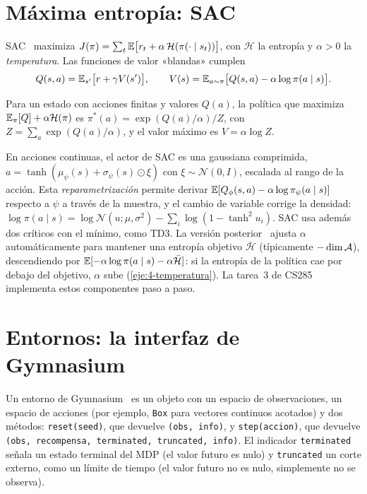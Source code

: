 \section{Máxima entropía: SAC}

\begin{definicion}\label{def:maxent}
SAC~\cite{sac} maximiza $J(\pi)=\sum_t\mathbb{E}\bigl[r_t+\alpha\,\mathcal H(\pi(\cdot\mid s_t))\bigr]$, con $\mathcal H$ la entropía y $\alpha>0$ la \emph{temperatura}. Las funciones de valor «blandas» cumplen
\[
Q(s,a)=\mathbb{E}_{s'}\bigl[r+\gamma V(s')\bigr],\qquad V(s)=\mathbb{E}_{a\sim\pi}\bigl[Q(s,a)-\alpha\log\pi(a\mid s)\bigr].
\]
\end{definicion}

\begin{proposicion}\label{prop:blanda}
Para un estado con acciones finitas y valores $Q(a)$, la política que maximiza $\mathbb{E}_\pi[Q]+\alpha\mathcal H(\pi)$ es $\pi^{*}(a)=\exp(Q(a)/\alpha)/Z$, con $Z=\sum_a\exp(Q(a)/\alpha)$, y el valor máximo es $V=\alpha\log Z$.
\end{proposicion}

\addtocounter{definicion}{1}%

En acciones continuas, el actor de SAC es una gaussiana comprimida, $a=\tanh(\mu_\psi(s)+\sigma_\psi(s)\odot\xi)$ con $\xi\sim\mathcal N(0,I)$, escalada al rango de la acción. Esta \emph{reparametrización} permite derivar $\mathbb{E}[Q_\phi(s,a)-\alpha\log\pi_\psi(a\mid s)]$ respecto a $\psi$ a través de la muestra, y el cambio de variable corrige la densidad: $\log\pi(a\mid s)=\log\mathcal N(u;\mu,\sigma^{2})-\sum_i\log(1-\tanh^{2}u_i)$. SAC usa además dos críticos con el mínimo, como TD3. La versión posterior~\cite{sac2} ajusta $\alpha$ automáticamente para mantener una entropía objetivo $\bar{\mathcal H}$ (típicamente $-\dim\mathcal{A}$), descendiendo por $\mathbb{E}[-\alpha\log\pi(a\mid s)-\alpha\bar{\mathcal H}]$: si la entropía de la política cae por debajo del objetivo, $\alpha$ sube (\cref{eje:4-temperatura}). La tarea~3 de CS285~\cite{cs285hw3} implementa estos componentes paso a paso.

\section{Entornos: la interfaz de Gymnasium}

\begin{definicion}\label{def:gym}
Un entorno de Gymnasium~\cite{gymnasium} es un objeto con un espacio de observaciones, un espacio de acciones (por ejemplo, \texttt{Box} para vectores continuos acotados) y dos métodos: \texttt{reset(seed)}, que devuelve \texttt{(obs, info)}, y \texttt{step(accion)}, que devuelve \texttt{(obs, recompensa, terminated, truncated, info)}. El indicador \texttt{terminated} señala un estado terminal del MDP (el valor futuro es nulo) y \texttt{truncated} un corte externo, como un límite de tiempo (el valor futuro no es nulo, simplemente no se observa).
\end{definicion}

